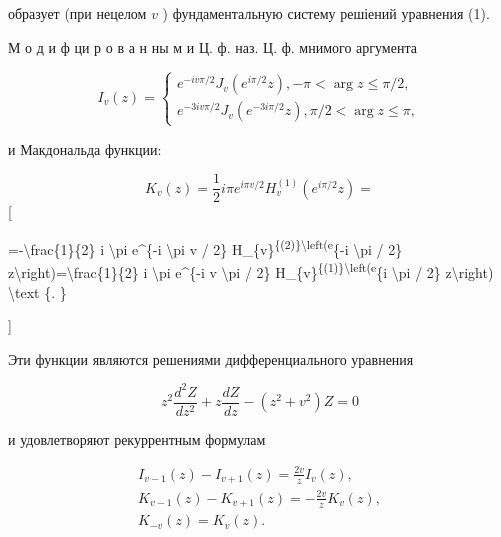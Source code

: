 \documentclass[10pt]{article}
\begin{document}
образует (при нецелом $v$ ) фундаментальную систему решіений уравнения (1).



М о д и ф ци р о в а н ны м и Ц. ф. наз. Ц. ф. мнимого аргумента



\[

I_{v}(z)=\left\{\begin{array}{l}

e^{-i v \pi / 2} J_{v}\left(e^{i \pi / 2} z\right),-\pi<\arg z \leqslant \pi / 2, \\

e^{-3 i v \pi / 2} J_{v}\left(e^{-3 i \pi / 2} z\right), \pi / 2<\arg z \leqslant \pi,

\end{array}\right.

\]



и Макдональда функции:



\[

K_{v}(z)=\frac{1}{2} i \pi e^{i \pi v / 2} H_{v}^{(1)}\left(e^{i \pi / 2} z\right)=

\][



=-\textbackslash frac\{1\}\{2\} i \textbackslash pi e\^{}\{-i \textbackslash pi v / 2\} H\_\{v\}\textsuperscript{\{(2)\}\textbackslash left(e}\{-i \textbackslash pi / 2\} z\textbackslash right)=\textbackslash frac\{1\}\{2\} i \textbackslash pi e\^{}\{-i v \textbackslash pi / 2\} H\_\{v\}\textsuperscript{\{(1)\}\textbackslash left(e}\{i \textbackslash pi / 2\} z\textbackslash right) \textbackslash text \{. \}

]



Эти функции являются решениями дифференциального уравнения



\[

z^{2} \frac{d^{2} Z}{d z^{2}}+z \frac{d Z}{d z}-\left(z^{2}+v^{2}\right) Z=0

\]



и удовлетворяют рекуррентным формулам



\[

\begin{gathered}

I_{v-1}(z)-I_{v+1}(z)=\frac{2 v}{z} I_{v}(z), \\

K_{v-1}(z)-K_{v+1}(z)=-\frac{2 v}{z} K_{v}(z), \\

K_{-v}(z)=K_{v}(z) .

\end{gathered}

\]
\end{document}
